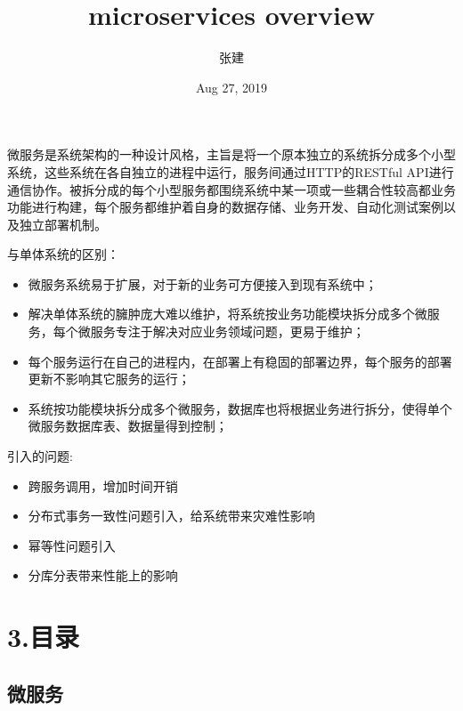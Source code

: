 \documentclass[letterpaper,10pt,english]{sphinxmanual}
\title{microservices overview}
\date{Aug 27, 2019}
\author{张建}
\begin{document}
\pagestyle{empty}
\sphinxmaketitle
\pagestyle{plain}
\sphinxtableofcontents
\pagestyle{normal}
\label{\detokenize{index::doc}}


微服务是系统架构的一种设计风格，主旨是将一个原本独立的系统拆分成多个小型系统，这些系统在各自独立的进程中运行，服务间通过HTTP的RESTful API进行通信协作。被拆分成的每个小型服务都围绕系统中某一项或一些耦合性较高都业务功能进行构建，每个服务都维护着自身的数据存储、业务开发、自动化测试案例以及独立部署机制。

与单体系统的区别：
\begin{itemize}
\item {} 
微服务系统易于扩展，对于新的业务可方便接入到现有系统中；

\item {} 
解决单体系统的臃肿庞大难以维护，将系统按业务功能模块拆分成多个微服务，每个微服务专注于解决对应业务领域问题，更易于维护；

\item {} 
每个服务运行在自己的进程内，在部署上有稳固的部署边界，每个服务的部署更新不影响其它服务的运行；

\item {} 
系统按功能模块拆分成多个微服务，数据库也将根据业务进行拆分，使得单个微服务数据库表、数据量得到控制；

\end{itemize}

引入的问题:
\begin{itemize}
\item {} 
跨服务调用，增加时间开销

\item {} 
分布式事务一致性问题引入，给系统带来灾难性影响

\item {} 
幂等性问题引入

\item {} 
分库分表带来性能上的影响

\end{itemize}


\chapter{3.目录}
\label{\detokenize{index:id2}}

\section{微服务}
\label{\detokenize{00.summary/summary:id1}}\label{\detokenize{00.summary/summary::doc}}
\end{document}
